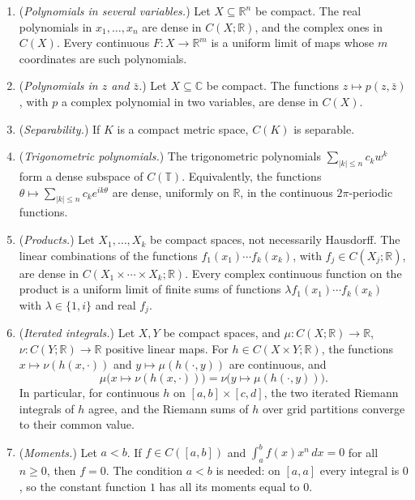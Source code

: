 \documentclass[
  english,
  11pt,
  a4paper,
]{article}
\providecommand{\tightlist}{%
  \setlength{\itemsep}{0pt}\setlength{\parskip}{0pt}}
\begin{document}
\begin{enumerate}
\tightlist
\item
  (\emph{Polynomials in several variables.}) Let
  \(X\subseteq\mathbb R^n\) be compact. The real polynomials in
  \(x_1,\dots,x_n\) are dense in \(C(X;\mathbb R)\), and the complex
  ones in \(C(X)\). Every continuous \(F:X\to\mathbb R^m\) is a uniform
  limit of maps whose \(m\) coordinates are such polynomials.
\item
  (\emph{Polynomials in \(z\) and \(\bar z\).}) Let
  \(X\subseteq\mathbb C\) be compact. The functions
  \(z\mapsto p(z,\bar z)\), with \(p\) a complex polynomial in two
  variables, are dense in \(C(X)\).
\item
  (\emph{Separability.}) If \(K\) is a compact metric space, \(C(K)\) is
  separable.
\item
  (\emph{Trigonometric polynomials.}) The trigonometric polynomials
  \(\sum_{|k|\leq n}c_kw^k\) form a dense subspace of \(C(\mathbb T)\).
  Equivalently, the functions
  \(\theta\mapsto\sum_{|k|\leq n}c_ke^{ik\theta}\) are dense, uniformly
  on \(\mathbb R\), in the continuous \(2\pi\)-periodic functions.
\item
  (\emph{Products.}) Let \(X_1,\dots,X_k\) be compact spaces, not
  necessarily Hausdorff. The linear combinations of the functions
  \(f_1(x_1)\cdots f_k(x_k)\), with \(f_j\in C(X_j;\mathbb R)\), are
  dense in \(C(X_1\times\cdots\times X_k;\mathbb R)\). Every complex
  continuous function on the product is a uniform limit of finite sums
  of functions \(\lambda f_1(x_1)\cdots f_k(x_k)\) with
  \(\lambda\in\{1,i\}\) and real \(f_j\).
\item
  (\emph{Iterated integrals.}) Let \(X,Y\) be compact spaces, and
  \(\mu:C(X;\mathbb R)\to\mathbb R\), \(\nu:C(Y;\mathbb R)\to\mathbb R\)
  positive linear maps. For \(h\in C(X\times Y;\mathbb R)\), the
  functions \(x\mapsto\nu(h(x,\cdot))\) and \(y\mapsto\mu(h(\cdot,y))\)
  are continuous, and
  \[\mu\bigl(x\mapsto\nu(h(x,\cdot))\bigr)=\nu\bigl(y\mapsto\mu(h(\cdot,y))\bigr).
  \tag{15.1}\] In particular, for continuous \(h\) on
  \([a,b]\times[c,d]\), the two iterated Riemann integrals of \(h\)
  agree, and the Riemann sums of \(h\) over grid partitions converge to
  their common value.
\item
  (\emph{Moments.}) Let \(a<b\). If \(f\in C([a,b])\) and
  \(\int_a^bf(x)x^n\,dx=0\) for all \(n\geq0\), then \(f=0\). The
  condition \(a<b\) is needed: on \([a,a]\) every integral is \(0\), so
  the constant function \(1\) has all its moments equal to \(0\).
\end{enumerate}
\end{document}
